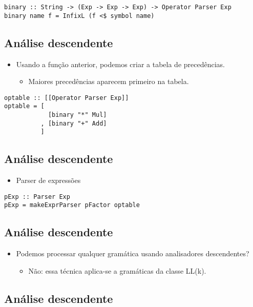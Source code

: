\documentclass[11pt]{article}
\begin{document}
\begin{verbatim}
binary :: String -> (Exp -> Exp -> Exp) -> Operator Parser Exp
binary name f = InfixL (f <$ symbol name)
\end{verbatim}
\subsection*{Análise descendente}
\label{sec:orgdd8c884}

\begin{itemize}
\item Usando a função anterior, podemos criar a tabela de precedências.
\begin{itemize}
\item Maiores precedências aparecem primeiro na tabela.
\end{itemize}
\end{itemize}

\begin{verbatim}
optable :: [[Operator Parser Exp]]
optable = [
            [binary "*" Mul]
          , [binary "+" Add]
          ]
\end{verbatim}
\subsection*{Análise descendente}
\label{sec:orgcad6fbe}

\begin{itemize}
\item Parser de expressões
\end{itemize}

\begin{verbatim}
pExp :: Parser Exp
pExp = makeExprParser pFactor optable
\end{verbatim}
\subsection*{Análise descendente}
\label{sec:org5c3ca01}

\begin{itemize}
\item Podemos processar qualquer gramática usando analisadores descendentes?
\begin{itemize}
\item Não: essa técnica aplica-se a gramáticas da classe LL(k).
\end{itemize}
\end{itemize}
\subsection*{Análise descendente}
\label{sec:org95202c6}
\end{document}
